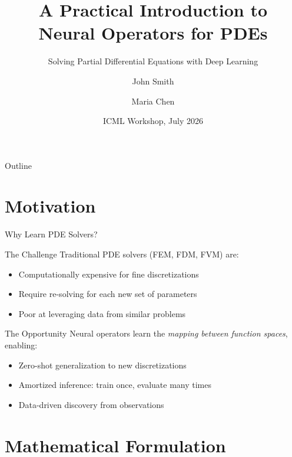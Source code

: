 \documentclass[11pt]{beamer}
\title[Neural Operator Tutorial]{A Practical Introduction to\\Neural Operators for PDEs}
\subtitle{Solving Partial Differential Equations with Deep Learning}
\author[Smith \& Chen]{John Smith \and Maria Chen}
\institute{University of Technology}
\date{ICML Workshop, July 2026}
\begin{document}
\begin{frame}
    \titlepage
\end{frame}

\begin{frame}{Outline}
    \tableofcontents
\end{frame}

\section{Motivation}

\begin{frame}{Why Learn PDE Solvers?}
    \begin{block}{The Challenge}
        Traditional PDE solvers (FEM, FDM, FVM) are:
        \begin{itemize}
            \item Computationally expensive for fine discretizations
            \item Require re-solving for each new set of parameters
            \item Poor at leveraging data from similar problems
        \end{itemize}
    \end{block}

    \pause

    \begin{alertblock}{The Opportunity}
        Neural operators learn the \emph{mapping between function spaces}, enabling:
        \begin{itemize}
            \item Zero-shot generalization to new discretizations
            \item Amortized inference: train once, evaluate many times
            \item Data-driven discovery from observations
        \end{itemize}
    \end{alertblock}
\end{frame}

\section{Mathematical Formulation}
\end{document}
